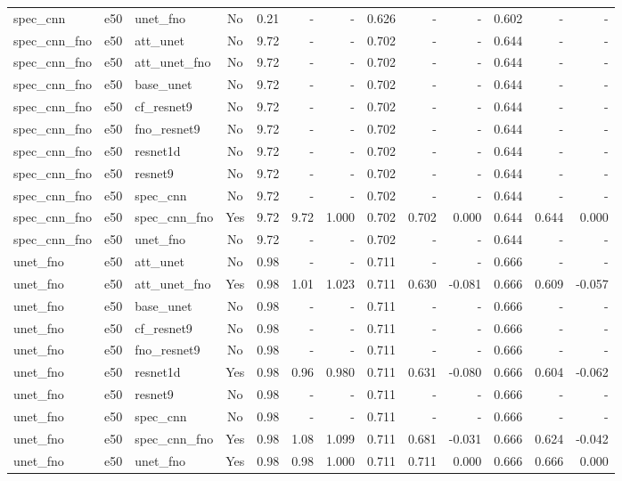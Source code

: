 \begin{tabular}{l l l c r r r r r r r r r}
spec_cnn & e50 & unet_fno & No & 0.21 & - & - & 0.626 & - & - & 0.602 & - & - \\
spec_cnn_fno & e50 & att_unet & No & 9.72 & - & - & 0.702 & - & - & 0.644 & - & - \\
spec_cnn_fno & e50 & att_unet_fno & No & 9.72 & - & - & 0.702 & - & - & 0.644 & - & - \\
spec_cnn_fno & e50 & base_unet & No & 9.72 & - & - & 0.702 & - & - & 0.644 & - & - \\
spec_cnn_fno & e50 & cf_resnet9 & No & 9.72 & - & - & 0.702 & - & - & 0.644 & - & - \\
spec_cnn_fno & e50 & fno_resnet9 & No & 9.72 & - & - & 0.702 & - & - & 0.644 & - & - \\
spec_cnn_fno & e50 & resnet1d & No & 9.72 & - & - & 0.702 & - & - & 0.644 & - & - \\
spec_cnn_fno & e50 & resnet9 & No & 9.72 & - & - & 0.702 & - & - & 0.644 & - & - \\
spec_cnn_fno & e50 & spec_cnn & No & 9.72 & - & - & 0.702 & - & - & 0.644 & - & - \\
spec_cnn_fno & e50 & spec_cnn_fno & Yes & 9.72 & 9.72 & 1.000 & 0.702 & 0.702 & 0.000 & 0.644 & 0.644 & 0.000 \\
spec_cnn_fno & e50 & unet_fno & No & 9.72 & - & - & 0.702 & - & - & 0.644 & - & - \\
unet_fno & e50 & att_unet & No & 0.98 & - & - & 0.711 & - & - & 0.666 & - & - \\
unet_fno & e50 & att_unet_fno & Yes & 0.98 & 1.01 & 1.023 & 0.711 & 0.630 & -0.081 & 0.666 & 0.609 & -0.057 \\
unet_fno & e50 & base_unet & No & 0.98 & - & - & 0.711 & - & - & 0.666 & - & - \\
unet_fno & e50 & cf_resnet9 & No & 0.98 & - & - & 0.711 & - & - & 0.666 & - & - \\
unet_fno & e50 & fno_resnet9 & No & 0.98 & - & - & 0.711 & - & - & 0.666 & - & - \\
unet_fno & e50 & resnet1d & Yes & 0.98 & 0.96 & 0.980 & 0.711 & 0.631 & -0.080 & 0.666 & 0.604 & -0.062 \\
unet_fno & e50 & resnet9 & No & 0.98 & - & - & 0.711 & - & - & 0.666 & - & - \\
unet_fno & e50 & spec_cnn & No & 0.98 & - & - & 0.711 & - & - & 0.666 & - & - \\
unet_fno & e50 & spec_cnn_fno & Yes & 0.98 & 1.08 & 1.099 & 0.711 & 0.681 & -0.031 & 0.666 & 0.624 & -0.042 \\
unet_fno & e50 & unet_fno & Yes & 0.98 & 0.98 & 1.000 & 0.711 & 0.711 & 0.000 & 0.666 & 0.666 & 0.000 \\
\bottomrule
\end{tabular}
